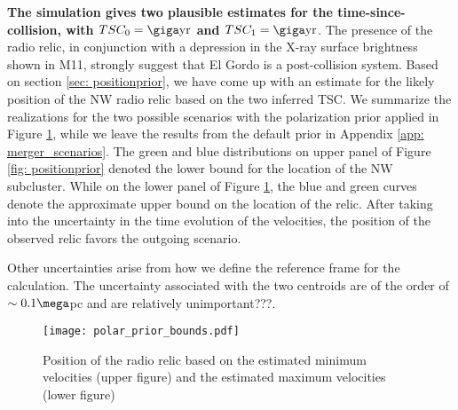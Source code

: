 \textbf{The simulation gives two plausible estimates for
the time-since-collision, with $TSC_0 = \giga \text{yr}$ and $TSC_1 = \giga
\text{yr}$}. The presence of the radio relic, in conjunction with a
depression in the X-ray surface brightness shown in M11, strongly suggest
that El Gordo is a post-collision system. 
Based on section \ref{sec: positionprior}, we have come up with an estimate for the
likely position of the NW radio relic based on the two inferred TSC. 
We summarize the realizations for the two possible scenarios with the
polarization prior applied in Figure \ref{fig: positionprior}, while we
leave the results from the default prior in Appendix \ref{app: merger_scenarios}.
The green and blue distributions on upper panel of Figure \ref{fig:
positionprior} denoted the lower bound for the location of the NW
subcluster. 
While on the lower panel of Figure \ref{fig: positionprior}, the blue and
green curves denote the approximate upper bound on the location of the
relic. After taking into the uncertainty in the time evolution of the velocities,
the position of the observed relic favors the outgoing scenario.  

Other
uncertainties arise from how we define the reference frame for the calculation. The
uncertainty associated with the two centroids are of the order
of $\sim 0.1 \mega$pc \citep{Jee13} and are relatively unimportant???.  

\begin{figure}
	\texttt{[image: polar\_prior\_bounds.pdf]}
	\caption{Position of the radio relic based on the estimated minimum
	velocities (upper figure) and the estimated maximum velocities (lower
	figure) \label{fig: positionprior}}
\end{figure}





